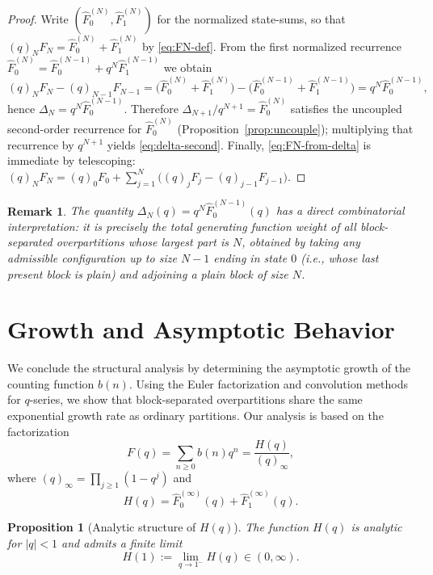 \documentclass[letterpaper,12pt]{article}
\newtheorem{proposition}{Proposition}
\newtheorem{remark}{Remark}
\begin{document}
\begin{proof}
Write $(\widehat F^{(N)}_0,\widehat F^{(N)}_1)$ for the normalized state-sums, so that
$(q)_N F_N=\widehat F^{(N)}_0+\widehat F^{(N)}_1$ by \eqref{eq:FN-def}.
From the first normalized recurrence
$\widehat F^{(N)}_0=\widehat F^{(N-1)}_0+q^N\widehat F^{(N-1)}_1$ we obtain
\[
(q)_N F_N-(q)_{N-1}F_{N-1}
=\bigl(\widehat F^{(N)}_0+\widehat F^{(N)}_1\bigr)
-\bigl(\widehat F^{(N-1)}_0+\widehat F^{(N-1)}_1\bigr)
=q^N\widehat F^{(N-1)}_0,
\]
hence $\Delta_N=q^N\widehat F^{(N-1)}_0$.
Therefore $\Delta_{N+1}/q^{N+1}=\widehat F^{(N)}_0$ satisfies the uncoupled second-order
recurrence for $\widehat F^{(N)}_0$ (Proposition~\ref{prop:uncouple}); multiplying that
recurrence by $q^{N+1}$ yields \eqref{eq:delta-second}.
Finally, \eqref{eq:FN-from-delta} is immediate by telescoping:
$(q)_N F_N=(q)_0F_0+\sum_{j=1}^N\bigl((q)_jF_j-(q)_{j-1}F_{j-1}\bigr)$.
\end{proof}

\begin{remark}
The quantity $\Delta_N(q)=q^N\widehat F^{(N-1)}_0(q)$ has a direct combinatorial interpretation:
it is precisely the total generating function weight of all block-separated overpartitions
whose largest part is $N$, obtained by taking any admissible configuration up to size $N-1$
ending in state $0$ (i.e., whose last present block is plain) and adjoining a plain block
of size $N$.
\end{remark}




 


 





\section{Growth and Asymptotic Behavior}\label{sec:Asymptotics}

We conclude the structural analysis by determining the asymptotic growth of the counting function $b(n)$. 
Using the Euler factorization and convolution methods for $q$-series, we show that block-separated overpartitions share the same exponential growth rate as ordinary partitions.  Our analysis is based on the factorization
\begin{equation}\label{eq:factorization}
F(q)=\sum_{n\ge0} b(n)q^n
=
\frac{H(q)}{(q)_\infty},
\end{equation}
where $(q)_\infty=\prod_{j\ge1}(1-q^j)$ and
\begin{equation}
    H(q)=\widehat F^{(\infty)}_0(q)+\widehat F^{(\infty)}_1(q).
\end{equation}
\begin{proposition}[Analytic structure of $H(q)$]\label{prop:Hanalytic}
The function $H(q)$ is analytic for $|q|<1$ and admits a finite limit
\begin{equation}
    H(1):=\lim_{q\to1^-}H(q)\in(0,\infty).
\end{equation}
\end{proposition}
\end{document}
